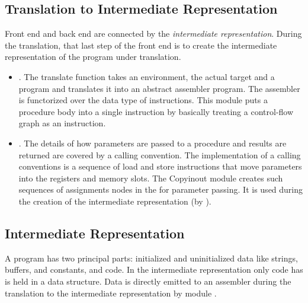 \documentclass{article}%
\begin{document}
\subsection{Translation to Intermediate Representation}

Front end and back end are connected by the \emph{intermediate
representation}. During the translation, that last step of
the front end is to create the intermediate representation of the
program under translation.

\begin{itemize} 

\item {}.  The {\Tt{}translate\nwendquote}
function takes an environment, the actual target and a program and
translates it into an abstract assembler program.  The assembler is
functorized over the data type of instructions. This module puts a
procedure body into a single instruction by basically treating a
control-flow graph as an instruction. 

\item {}. The details of how parameters are
passed to a procedure and results are returned are covered by a calling
convention. The implementation of a calling conventions is a sequence of
load and store instructions that move parameters into the registers and
memory slots. The {\Tt{}Copyinout\nwendquote} module creates such sequences of
assignments nodes in the {\cfg} for parameter passing. It is used during
the creation of the intermediate representation (by
).

\end{itemize}


\subsection{Intermediate Representation}

A program has two principal parts: initialized and uninitialized data
like strings, buffers, and constants, and code. In the intermediate
representation only code has is held in a data structure. Data is
directly emitted to an assembler during the translation to the
intermediate representation by module .
\end{document}
